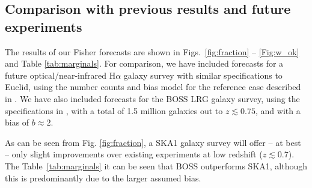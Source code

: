 \documentclass[useAMS,usenatbib]{mn2e}
\newcommand{\corr}{\color{blue}} %
\begin{document}





\subsection{Comparison with previous results and future experiments}\label{sec:comparison}



The results of our Fisher forecasts are shown in Figs.~\ref{fig:fraction} -- \ref{Fig:w_ok} and Table \ref{tab:marginals}. For comparison, we have included forecasts for a future optical/near-infrared H$\alpha$ galaxy survey with similar specifications to Euclid, using the number counts and bias model for the reference case described in \citet{2013LRR....16....6A}.  {\corr We have also included forecasts for the BOSS LRG galaxy survey, using the specifications in \cite{2013AJ....145...10D}, with a total of 1.5 million galaxies out to $z \lesssim 0.75$, and with a bias of $b \approx 2$.}


As can be seen from Fig. \ref{fig:fraction}, a SKA1 galaxy survey will offer -- at best -- only slight improvements over existing experiments at low redshift ($z \lesssim 0.7$). {\corr The Table~\ref{tab:marginals} it can be seen that BOSS outperforms SKA1, although this is predominantly due to the larger assumed bias.}
\end{document}
